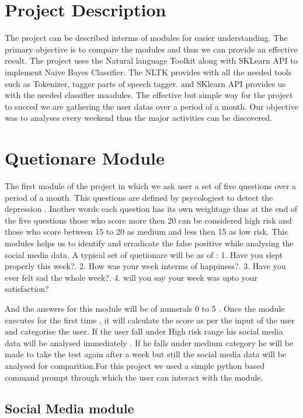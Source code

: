 \documentclass{chi2009}
\begin{document}
\begin{Abstract}
\section{Project Description}

The project can be described interms of modules for easier understanding. The primary objective is to compare the modules and thus we can provide an effective result. The project uses the Natural language Toolkit along with SKLearn API to implement Naive Bayes Classifier. The NLTK provides with all the needed tools such as Tokenizer, tagger parts of speech tagger. and SKlearn API provides us with the needed classifier maodules. The effective but simple way for the project to succed we are gathering the user datas over a period of a month. Our objective was to analyses every weekend thus the major activities can be discovered. 


\section{Quetionare Module}
The first module of the project in which we ask user a set of five questions over a period of a month. This questions are defined by psycologiest to detect the depression . Inother words each question has its own weightage thus at the end of the five questions those who score more then 20 can be considered high risk and those who score between 15 to 20 as medium and less then 15 as low risk. This modules helps us to identify and erradicate the false positive while analysing the social media data. A typical set of quetionare will be as of : 
1. Have you slept properly this week?. 
2. How was your week interms of happiness?.
3. Have you ever felt sad the whole week?.
4. will you say your week was upto your satisfaction?

And the answers for this module will be of numerals 0 to 5 . Once the module executes for the first time , it will calculate the score as per the input of the user and categorise the user. If the user fall under High risk range his social media data will be analysed immediately . If he falls under medium category he will be made to take the test again after a week but still the social media data will be analysed for comparition.For this project we used a simple python based command prompt through which the user can interact with the module. 





\subsection{Social Media module}


\end{Abstract}
\end{document}

